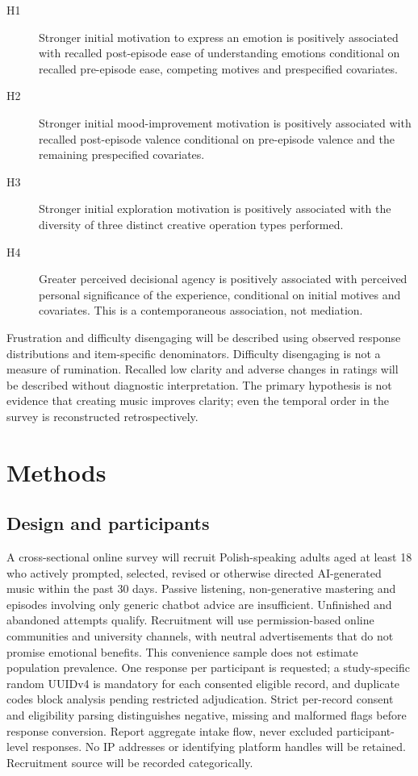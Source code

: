 \documentclass[11pt,a4paper]{article}
\begin{document}
\begin{description}
\item[H1] Stronger initial motivation to express an emotion is positively associated with recalled post-episode ease of understanding emotions conditional on recalled pre-episode ease, competing motives and prespecified covariates.
\item[H2] Stronger initial mood-improvement motivation is positively associated with recalled post-episode valence conditional on pre-episode valence and the remaining prespecified covariates.
\item[H3] Stronger initial exploration motivation is positively associated with the diversity of three distinct creative operation types performed.
\item[H4] Greater perceived decisional agency is positively associated with perceived personal significance of the experience, conditional on initial motives and covariates. This is a contemporaneous association, not mediation.
\end{description}
Frustration and difficulty disengaging will be described using observed response distributions and item-specific denominators. Difficulty disengaging is not a measure of rumination. Recalled low clarity and adverse changes in ratings will be described without diagnostic interpretation. The primary hypothesis is not evidence that creating music improves clarity; even the temporal order in the survey is reconstructed retrospectively.

\section{Methods}
\subsection{Design and participants}
A cross-sectional online survey will recruit Polish-speaking adults aged at least 18 who actively prompted, selected, revised or otherwise directed AI-generated music within the past 30 days. Passive listening, non-generative mastering and episodes involving only generic chatbot advice are insufficient. Unfinished and abandoned attempts qualify. Recruitment will use permission-based online communities and university channels, with neutral advertisements that do not promise emotional benefits. This convenience sample does not estimate population prevalence. One response per participant is requested; a study-specific random UUIDv4 is mandatory for each consented eligible record, and duplicate codes block analysis pending restricted adjudication. Strict per-record consent and eligibility parsing distinguishes negative, missing and malformed flags before response conversion. Report aggregate intake flow, never excluded participant-level responses. No IP addresses or identifying platform handles will be retained. Recruitment source will be recorded categorically.
\end{document}
